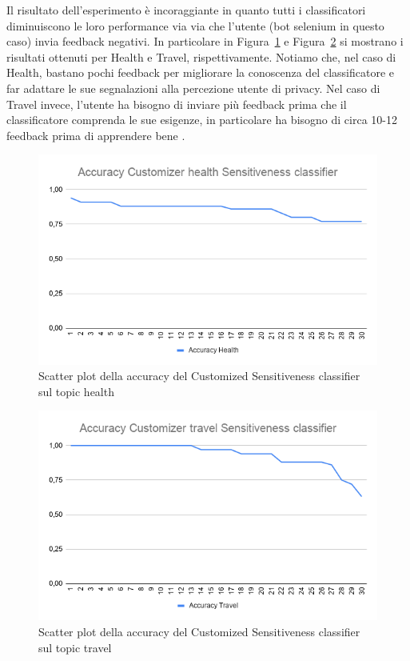 Il risultato dell'esperimento è incoraggiante in quanto tutti i classificatori diminuiscono le loro performance via via che l'utente (bot selenium in questo caso) invia feedback negativi. In particolare in Figura~\ref{fig:plot_acc-health} e Figura~\ref{fig:plot_acc-travel} si mostrano i risultati ottenuti per Health e Travel, rispettivamente. Notiamo che, nel caso di Health, bastano pochi feedback per migliorare la conoscenza del classificatore e far adattare le sue segnalazioni alla percezione utente di privacy. Nel caso di Travel invece, l'utente ha bisogno di inviare più feedback prima che il classificatore comprenda le sue esigenze, in particolare ha bisogno di circa 10-12 feedback prima di apprendere bene .

\begin{figure}[h!t]
    \centering
    \includegraphics[width=15cm]{Figure/qualitativa/Custom_health-Sens.png}
    \caption{Scatter plot della accuracy del Customized Sensitiveness classifier sul topic health}
    \label{fig:plot_acc-health}
\end{figure}
\FloatBarrier

\begin{figure}[h!t]
    \centering
    \includegraphics[width=15cm]{Figure/qualitativa/Customizer_travel-Sens.png}
    \caption{Scatter plot della accuracy del Customized Sensitiveness classifier sul topic travel}
    \label{fig:plot_acc-travel}
\end{figure}
\FloatBarrier

